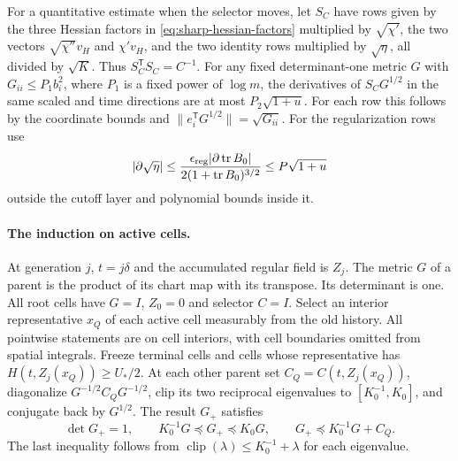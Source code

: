 \documentclass[11pt]{article}
\newcommand{\1}{\mathbf{1}}
\numberwithin{equation}{section}
\newcommand{\tr}{\operatorname{tr}}
\begin{document}
For a quantitative estimate when the selector moves, let \(S_C\)
have rows given by the three Hessian factors in
\eqref{eq:sharp-hessian-factors} multiplied by \(\sqrt{\chi'}\),
the two vectors \(\sqrt{\chi''}v_H\) and \(\chi'v_H\), and the
two identity rows multiplied by \(\sqrt{\eta}\), all divided
by \(\sqrt K\). Thus \(S_C^{\mathsf T}S_C=C^{-1}\).
For any fixed determinant-one metric \(G\) with
\(G_{ii}\le P_1 b_i^2\), where \(P_1\) is a fixed power of \(\log m\),
the derivatives of \(S_CG^{1/2}\) in the same scaled and time
directions are at most \(P_2\sqrt{1+u}\). For each row this follows
by the coordinate bounds and \(\|e_i^{\mathsf T}G^{1/2}\|
=\sqrt{G_{ii}}\). For the regularization rows use
\[
 |\partial\sqrt{\eta}|\le
 \frac{\epsilon_{\rm reg}|\partial\tr B_0|}
 {2(1+\tr B_0)^{3/2}}
 \le P\sqrt{1+u}
\]
outside the cutoff layer and polynomial bounds inside it.

\paragraph{The induction on active cells.}
At generation \(j\), \(t=j\delta\) and the accumulated regular
field is \(Z_j\). The metric \(G\) of a parent is the product of
its chart map with its transpose. Its determinant is one.
All root cells have \(G=I\), \(Z_0=0\) and selector \(C=I\).
Select an interior representative \(x_Q\) of each active cell
measurably from the old history. All pointwise statements
are on cell interiors, with cell boundaries omitted from
spatial integrals. Freeze terminal cells and cells whose representative
has \(H(t,Z_j(x_Q))\ge U_*/2\).
At each other parent set \(C_Q=C(t,Z_j(x_Q))\), diagonalize
\(G^{-1/2}C_QG^{-1/2}\), clip its two reciprocal eigenvalues
to \([K_0^{-1},K_0]\), and conjugate back by \(G^{1/2}\).
The result \(G_+\) satisfies
\begin{equation}\label{eq:sharp-metric-clip}
 \det G_+=1,\qquad K_0^{-1}G\preceq G_+\preceq K_0G,\qquad
 G_+\preceq K_0^{-1}G+C_Q .
\end{equation}
The last inequality follows from
\(\operatorname{clip}(\lambda)\le K_0^{-1}+\lambda\)
for each eigenvalue.
\end{document}

